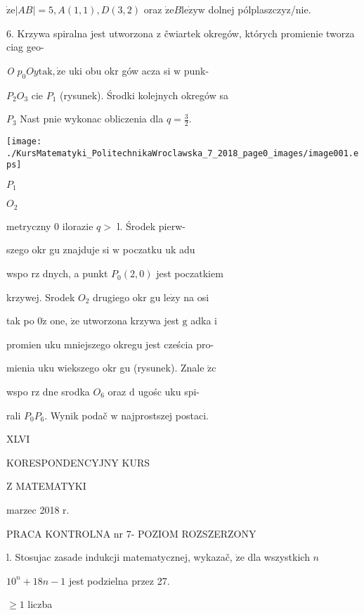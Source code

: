 \documentclass[a4paper,12pt]{article}
\begin{document}
$\dot{\mathrm{z}}\mathrm{e}|AB|=5, A(1,1), D(3,2)$ oraz $\dot{\mathrm{z}}\mathrm{e}B\mathrm{l}\mathrm{e}\dot{\mathrm{z}}\mathrm{y}\mathrm{w}$ dolnej pólplaszczyz/nie.

6. Krzywa spiralna jest utworzona $\mathrm{z}$ čwiartek okregów, których promienie tworza ciag geo-

{\it O} $p_{0} Oy \mathrm{t}\mathrm{a}\mathrm{k}, \dot{\mathrm{z}}\mathrm{e}$ uki obu okr gów acza si $\mathrm{w}$ punk-

$P_{2} O_{3}$ cie $P_{1}$ (rysunek). Środki kolejnych okregów sa

$P_{3}$ Nast pnie wykonac obliczenia dla $q=\displaystyle \frac{3}{2}.$
\begin{center}
\texttt{[image: ./KursMatematyki\_PolitechnikaWroclawska\_7\_2018\_page0\_images/image001.eps]}
\end{center}
$P_{1}$

$O_{2}$

metryczny $0$ ilorazie $q >$ l. Środek pierw-

szego okr gu znajduje si $\mathrm{w}$ poczatku uk adu

wspo rz dnych, a punkt $P_{0}(2,0)$ jest poczatkiem

krzywej. Srodek $O_{2}$ drugiego okr gu $\mathrm{l}\mathrm{e}\dot{\mathrm{z}}\mathrm{y}$ na osi

tak po $0\dot{\mathrm{z}}$ one, $\dot{\mathrm{z}}\mathrm{e}$ utworzona krzywa jest $\mathrm{g}$ adka $\mathrm{i}$

promien uku mniejszego okregu jest cześcia pro-

mienia uku wiekszego okr gu (rysunek). Znale $\acute{\mathrm{z}}\mathrm{c}$

wspo rz dne srodka $O_{6}$ oraz $\mathrm{d}$ ugośc uku spi-

rali $P_{0}P_{6}$. Wynik podač $\mathrm{w}$ najprostszej postaci.




XLVI

KORESPONDENCYJNY KURS

Z MATEMATYKI

marzec 2018 r.

PRACA KONTROLNA nr 7- POZIOM ROZSZERZONY

l. Stosujac zasade indukcji matematycznej, wykazač, $\dot{\mathrm{z}}\mathrm{e}$ dla wszystkich $n$

$10^{n}+18n-1$ jest podzielna przez 27.

$\geq 1$ liczba
\end{document}
